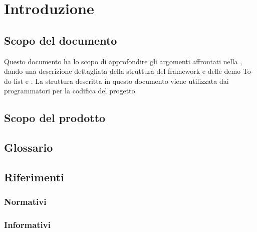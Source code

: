 \section{Introduzione}

\subsection{Scopo del documento}
Questo documento ha lo scopo di approfondire gli argomenti affrontati nella \SpecificaTecnica{}, dando una descrizione dettagliata della struttura del framework \ProjectName{} e delle demo To-do list e \DemoName{}. La struttura descritta in questo documento viene utilizzata dai programmatori per la codifica del progetto.

\subsection{Scopo del prodotto}
\ScopoDelProdotto

\subsection{Glossario}
\GlossarioIntroduzione

\subsection{Riferimenti}
\subsubsection{Normativi}
\subsubsection{Informativi}

